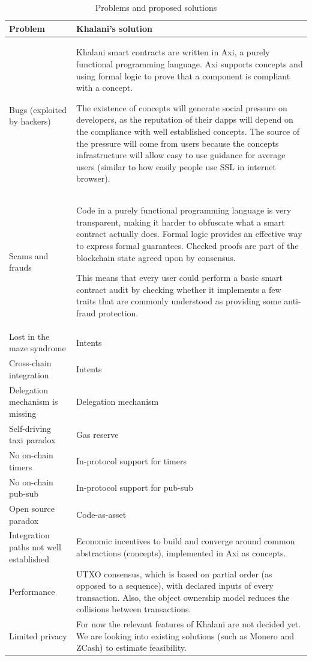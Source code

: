 \documentclass[a4paper]{article}
\begin{document}
\begin{table}
\caption{Problems and proposed solutions}
\label{table:problems-and-solutions}
\centering
\begin{tabularx}{\textwidth}{| X | p{} |} %
\toprule
\textbf{Problem} & \textbf{Khalani’s solution} \\
\midrule
Bugs (exploited by hackers) & Khalani smart contracts are written in Axi, a purely functional programming language. Axi supports concepts and using formal logic to prove that a component is compliant with a concept.

The existence of concepts will generate social pressure on developers, as the reputation of their dapps will depend on the compliance with well established concepts. The source of the pressure will come from users because the concepts infrastructure will allow easy to use guidance for average users (similar to how easily people use SSL in internet browser). \\
\midrule
Scams and frauds & Code in a purely functional programming language is very transparent, making it harder to obfuscate what a smart contract actually does. Formal logic provides an effective way to express formal guarantees. Checked proofs are part of the blockchain state agreed upon by consensus.

This means that every user could perform a basic smart contract audit by checking whether it implements a few traits that are commonly understood as providing some anti-fraud protection. \\
\midrule
Lost in the maze syndrome & Intents \\
\midrule
Cross-chain integration & Intents \\
\midrule
Delegation mechanism is missing & Delegation mechanism \\
\midrule
Self-driving taxi paradox & Gas reserve \\
\midrule
No on-chain timers & In-protocol support for timers \\
\midrule
No on-chain pub-sub & In-protocol support for pub-sub \\
\midrule
Open source paradox & Code-as-asset \\
\midrule
Integration paths not well established & Economic incentives to build and converge around common abstractions (concepts), implemented in Axi as concepts. \\
\midrule
Performance & UTXO consensus, which is based on partial order (as opposed to a sequence), with declared inputs of every transaction. Also, the object ownership model reduces the collisions between transactions. \\
\midrule
Limited privacy & For now the relevant features of Khalani are not decided yet. We are looking into existing solutions (such as Monero and ZCash) to estimate feasibility. \\
\bottomrule
\end{tabularx}
\end{table}
\end{document}
